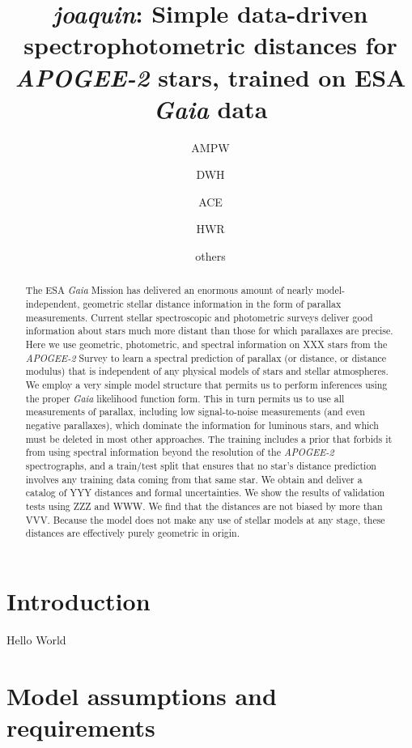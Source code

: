 \documentclass[modern]{aastex631}
\newcommand{\acronym}[1]{{\small{#1}}}
\newcommand{\project}[1]{\textsl{#1}}
\newcommand{\joaquin}{\project{joaquin}}
\newcommand{\ESA}{\acronym{ESA}}
\newcommand{\Gaia}{\project{Gaia}}
\newcommand{\APOGEE}{\project{\acronym{APOGEE-2}}}
\begin{document}
\title{\joaquin{}: Simple data-driven spectrophotometric distances for \APOGEE{} stars, trained on \ESA{} \Gaia{} data}

\author{AMPW}

\author{DWH}

\author{ACE}

\author{HWR}

\author{others}

\begin{abstract}
The \ESA{} \Gaia{} Mission has delivered an enormous amount of nearly
model-independent, geometric stellar distance information in the form
of parallax measurements.
Current stellar spectroscopic and photometric surveys deliver
good information about stars much more distant than those for which
parallaxes are precise.
Here we use geometric, photometric, and spectral information on XXX
stars from the \APOGEE{} Survey to learn a spectral prediction of
parallax (or distance, or distance modulus) that is independent of
any physical models of stars and stellar atmospheres.
We employ a very simple model structure that permits us to perform
inferences using the proper \Gaia{} likelihood function form.
This in turn permits us to use all measurements of parallax, including
low signal-to-noise measurements (and even negative parallaxes), which
dominate the information for luminous stars, and which must be deleted
in most other approaches.
The training includes a prior that forbids it from using spectral
information beyond the resolution of the \APOGEE{} spectrographs,
and a train/test split that ensures that no star's distance prediction
involves any training data coming from that same star.
We obtain and deliver a catalog of YYY distances and formal uncertainties.
We show the results of validation tests using ZZZ and WWW.
We find that the distances are not biased by more than VVV.
Because the model does not make any use of stellar models at any
stage, these distances are effectively purely geometric in origin.
\end{abstract}


\section{Introduction}\label{sec:intro}

Hello World

\section{Model assumptions and requirements}
\end{document}
